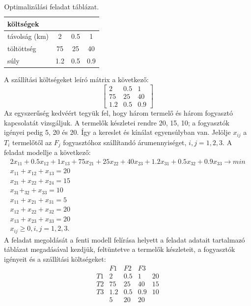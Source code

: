 \begin{table}[h]
    \centering
    \caption{Optimalizálási feladat táblázat.}
    \label{tab:optim}
    \begin{tabular}{l|c|c|c|}
        költségek &  &  & \\
        \hline
        távolság (km)  & 2 & 0.5 & 1 \\
        töltöttség & 75 & 25 & 40 \\
        súly & 1.2 & 0.5 & 0.9 \\
        \hline
    \end{tabular}
\end{table}
A szállítási költségeket leíró  mátrix a következő:
\[
\begin{bmatrix}
    2 & 0.5 & 1 \\
    75 & 25 & 40\\
    1.2 & 0.5 & 0.9
\end{bmatrix}
\]
Az egyszerűség kedvéért tegyük fel, hogy három termelő és három fogyasztó kapcsolatát vizsgáljuk. A termelők készletei
rendre 20, 15, 10; a fogyasztók igényei pedig 5, 20 és 20. Így a kereslet és kínálat egyensúlyban van.
Jelölje $x_{ij}$ a $T_{i}$ termelőtől az $F_{j}$ fogyasztóhoz szállítandó árumennyiséget, $i, j = 1, 2, 3.$ A feladat modellje a következő:
\begin{gather*}
    2x_{11} +0.5x_{12} +1x_{13} +75x_{21} +25x_{22} +40x_{23} +1.2x_{31} +0.5x_{32} +0.9x_{33} \rightarrow min \\
    x_{11} +x_{12} +x_{13} =20 \\
    x_{21} +x_{22} +x_{24} =15 \\
    x_{31} +_{32} +x_{33} =10 \\
    x_{11} +x_{21} +x_{31} =5 \\
    x_{12} +x_{22} +x_{32} =20 \\
    x_{13} +x_{23} +x_{33} =20 \\
    x_{ij} \geq0,  i,j = 1,2,3.
\end{gather*}
A feladat megoldását a fenti modell felírása helyett a feladat adatait tartalmazó táblázat megadásával kezdjük, feltüntetve a termelők készleteit, a fogyasztók igényeit és a szállítási költségeket:
\[
    \begin{matrix}
         & F1 & F2 & F3 \\
      T1 & 2 & 0.5 & 1 &  20 \\
      T2 & 75 & 25 & 40 & 15\\
      T3 & 1.2 & 0.5 & 0.9 & 10 \\
         & 5 & 20 & 20
    \end{matrix}
\]
